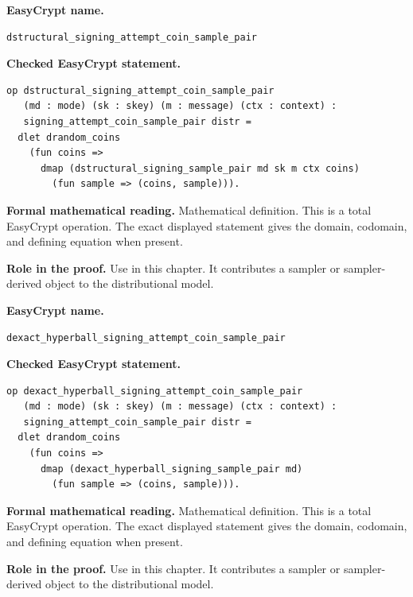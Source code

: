 \begin{formaldefinition}
\noindent\textbf{EasyCrypt name.}
\begin{lstlisting}[language=EasyCrypt,basicstyle=\ttfamily\scriptsize]
dstructural_signing_attempt_coin_sample_pair
\end{lstlisting}
\noindent\textbf{Checked EasyCrypt statement.}
\begin{lstlisting}[language=EasyCrypt,basicstyle=\ttfamily\scriptsize]
op dstructural_signing_attempt_coin_sample_pair
   (md : mode) (sk : skey) (m : message) (ctx : context) :
   signing_attempt_coin_sample_pair distr =
  dlet drandom_coins
    (fun coins =>
      dmap (dstructural_signing_sample_pair md sk m ctx coins)
        (fun sample => (coins, sample))).
\end{lstlisting}
\noindent\textbf{Formal mathematical reading.}
Mathematical definition. This is a total EasyCrypt operation.  The exact displayed statement gives the domain, codomain, and defining equation when present.

\noindent\textbf{Role in the proof.}
Use in this chapter. It contributes a sampler or sampler-derived object to the distributional model.

\end{formaldefinition}

\begin{formaldefinition}
\noindent\textbf{EasyCrypt name.}
\begin{lstlisting}[language=EasyCrypt,basicstyle=\ttfamily\scriptsize]
dexact_hyperball_signing_attempt_coin_sample_pair
\end{lstlisting}
\noindent\textbf{Checked EasyCrypt statement.}
\begin{lstlisting}[language=EasyCrypt,basicstyle=\ttfamily\scriptsize]
op dexact_hyperball_signing_attempt_coin_sample_pair
   (md : mode) (sk : skey) (m : message) (ctx : context) :
   signing_attempt_coin_sample_pair distr =
  dlet drandom_coins
    (fun coins =>
      dmap (dexact_hyperball_signing_sample_pair md)
        (fun sample => (coins, sample))).
\end{lstlisting}
\noindent\textbf{Formal mathematical reading.}
Mathematical definition. This is a total EasyCrypt operation.  The exact displayed statement gives the domain, codomain, and defining equation when present.

\noindent\textbf{Role in the proof.}
Use in this chapter. It contributes a sampler or sampler-derived object to the distributional model.

\end{formaldefinition}

